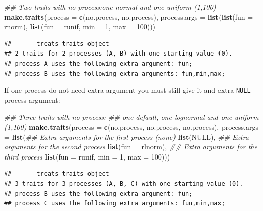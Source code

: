 \documentclass[
]{book}
\newenvironment{Shaded}{\begin{snugshade}}{\end{snugshade}}
\newcommand{\CommentTok}[1]{\textcolor[rgb]{0.56,0.35,0.01}{\textit{#1}}}
\newcommand{\DataTypeTok}[1]{\textcolor[rgb]{0.13,0.29,0.53}{#1}}
\newcommand{\DecValTok}[1]{\textcolor[rgb]{0.00,0.00,0.81}{#1}}
\newcommand{\KeywordTok}[1]{\textcolor[rgb]{0.13,0.29,0.53}{\textbf{#1}}}
\newcommand{\NormalTok}[1]{#1}
\newcommand{\OtherTok}[1]{\textcolor[rgb]{0.56,0.35,0.01}{#1}}
\begin{document}
\begin{Shaded}
\begin{Highlighting}[]
\CommentTok{\#\# Two traits with no process:one normal and one uniform (1,100)}
\KeywordTok{make.traits}\NormalTok{(}\DataTypeTok{process      =} \KeywordTok{c}\NormalTok{(no.process, no.process),}
            \DataTypeTok{process.args =} \KeywordTok{list}\NormalTok{(}\KeywordTok{list}\NormalTok{(}\DataTypeTok{fun =}\NormalTok{ rnorm),}
                                \KeywordTok{list}\NormalTok{(}\DataTypeTok{fun =}\NormalTok{ runif, }\DataTypeTok{min =} \DecValTok{1}\NormalTok{, }\DataTypeTok{max =} \DecValTok{100}\NormalTok{)))}
\end{Highlighting}
\end{Shaded}

\begin{verbatim}
##  ---- treats traits object ---- 
## 2 traits for 2 processes (A, B) with one starting value (0).
## process A uses the following extra argument: fun;
## process B uses the following extra arguments: fun,min,max;
\end{verbatim}

If one process do not need extra argument you must still give it and extra \texttt{NULL} process argument:

\begin{Shaded}
\begin{Highlighting}[]
\CommentTok{\#\# Three traits with no process:}
\CommentTok{\#\# one default, one lognormal and one uniform (1,100)}
\KeywordTok{make.traits}\NormalTok{(}\DataTypeTok{process      =} \KeywordTok{c}\NormalTok{(no.process, no.process, no.process),}
            \DataTypeTok{process.args =} \KeywordTok{list}\NormalTok{(}\CommentTok{\#\# Extra arguments for the first process (none)}
                                \KeywordTok{list}\NormalTok{(}\OtherTok{NULL}\NormalTok{),}
                                \CommentTok{\#\# Extra arguments for the second process}
                                \KeywordTok{list}\NormalTok{(}\DataTypeTok{fun =}\NormalTok{ rlnorm),}
                                \CommentTok{\#\# Extra arguments for the third process}
                                \KeywordTok{list}\NormalTok{(}\DataTypeTok{fun =}\NormalTok{ runif, }\DataTypeTok{min =} \DecValTok{1}\NormalTok{, }\DataTypeTok{max =} \DecValTok{100}\NormalTok{)))}
\end{Highlighting}
\end{Shaded}

\begin{verbatim}
##  ---- treats traits object ---- 
## 3 traits for 3 processes (A, B, C) with one starting value (0).
## process B uses the following extra argument: fun;
## process C uses the following extra arguments: fun,min,max;
\end{verbatim}
\end{document}

